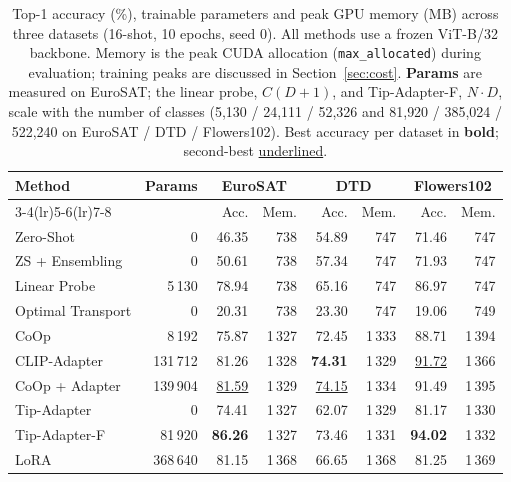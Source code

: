 \documentclass[10pt,twocolumn,letterpaper]{article}
\begin{document}
\begin{table}[t]
\centering
\caption{Top-1 accuracy (\%), trainable parameters and peak GPU memory
  (MB) across three datasets (16-shot, 10 epochs, seed 0).  All methods use
  a frozen ViT-B/32 backbone.  Memory is the peak CUDA allocation
  (\texttt{max\_allocated}) during evaluation; training peaks are discussed
  in Section~\ref{sec:cost}.  \textbf{Params} are measured on EuroSAT; the
  linear probe, $C(D{+}1)$, and Tip-Adapter-F, $N{\cdot}D$, scale with the
  number of classes (5{,}130 / 24{,}111 / 52{,}326 and
  81{,}920 / 385{,}024 / 522{,}240 on EuroSAT / DTD / Flowers102).  Best
  accuracy per dataset in \textbf{bold}; second-best
  \underline{underlined}.}
\label{tab:main}
\small
\begin{tabular}{@{}lrrrrrrr@{}}
\toprule
\multirow{2}{*}{\textbf{Method}} &
\multirow{2}{*}{\textbf{Params}} &
\multicolumn{2}{c}{\textbf{EuroSAT}} &
\multicolumn{2}{c}{\textbf{DTD}} &
\multicolumn{2}{c}{\textbf{Flowers102}} \\
\cmidrule(lr){3-4}\cmidrule(lr){5-6}\cmidrule(lr){7-8}
& & Acc. & Mem. & Acc. & Mem. & Acc. & Mem. \\
\midrule
Zero-Shot           & 0       & 46.35 & 738  & 54.89 & 747  & 71.46 & 747  \\
ZS + Ensembling     & 0       & 50.61 & 738  & 57.34 & 747  & 71.93 & 747  \\
Linear Probe        & 5\,130  & 78.94 & 738  & 65.16 & 747  & 86.97 & 747  \\
Optimal Transport   & 0       & 20.31 & 738  & 23.30 & 747  & 19.06 & 749  \\
\midrule
CoOp                & 8\,192  & 75.87 & 1\,327  & 72.45 & 1\,333  & 88.71 & 1\,394  \\
CLIP-Adapter        & 131\,712 & 81.26 & 1\,328  & \textbf{74.31} & 1\,329  & \underline{91.72} & 1\,366  \\
CoOp + Adapter      & 139\,904 & \underline{81.59} & 1\,329  & \underline{74.15} & 1\,334  & 91.49 & 1\,395  \\
\midrule
Tip-Adapter         & 0       & 74.41 & 1\,327  & 62.07 & 1\,329  & 81.17 & 1\,330  \\
Tip-Adapter-F       & 81\,920 & \textbf{86.26} & 1\,327  & 73.46 & 1\,331  & \textbf{94.02} & 1\,332  \\
LoRA                & 368\,640 & 81.15 & 1\,368  & 66.65 & 1\,368  & 81.25 & 1\,369  \\
\bottomrule
\end{tabular}
\end{table}
\end{document}
